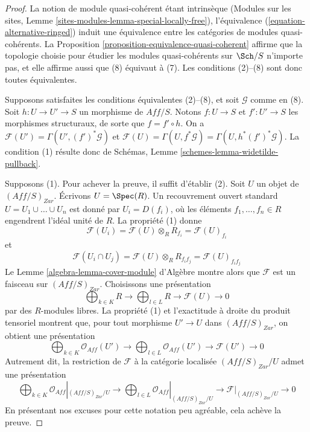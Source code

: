 \begin{proof}
La notion de module quasi-cohérent étant intrinsèque (Modules sur les sites,
Lemme \ref{sites-modules-lemma-special-locally-free}), l'équivalence
(\ref{equation-alternative-ringed}) induit une équivalence entre les
catégories de modules quasi-cohérents. La
Proposition \ref{proposition-equivalence-quasi-coherent} affirme que la
topologie choisie pour étudier les modules quasi-cohérents sur $\Sch/S$
n'importe pas, et elle affirme aussi que (8) équivaut à (7). Les conditions
(2)--(8) sont donc toutes équivalentes.

\medskip\noindent
Supposons satisfaites les conditions équivalentes (2)--(8), et soit
$\mathcal{G}$ comme en (8). Soit $h : U \to U' \to S$ un morphisme de
$\textit{Aff}/S$. Notons $f : U \to S$ et $f' : U' \to S$ les morphismes
structuraux, de sorte que $f = f' \circ h$. On a
$\mathcal{F}(U') = \Gamma(U', (f')^*\mathcal{G})$ et
$\mathcal{F}(U) = \Gamma(U, f^*\mathcal{G}) = \Gamma(U, h^*(f')^*\mathcal{G})$.
La condition (1) résulte donc de Schémas, Lemme
\ref{schemes-lemma-widetilde-pullback}.

\medskip\noindent
Supposons (1). Pour achever la preuve, il suffit d'établir (2).
Soit $U$ un objet de $(\textit{Aff}/S)_{Zar}$. Écrivons
$U = \Spec(R)$. Un recouvrement ouvert standard
$U = U_1 \cup \ldots \cup U_n$ est donné par $U_i = D(f_i)$, où les
éléments $f_1, \ldots, f_n \in R$ engendrent l'idéal unité de $R$.
La propriété (1) donne
$$
\mathcal{F}(U_i) =
\mathcal{F}(U) \otimes_R R_{f_i} =
\mathcal{F}(U)_{f_i}
$$
et
$$
\mathcal{F}(U_i \cap U_j) =
\mathcal{F}(U) \otimes_R R_{f_if_j} =
\mathcal{F}(U)_{f_if_j}
$$
Le Lemme \ref{algebra-lemma-cover-module} d'Algèbre montre alors que
$\mathcal{F}$ est un faisceau sur $(\textit{Aff}/S)_{Zar}$. Choisissons une
présentation
$$
\bigoplus\nolimits_{k \in K} R
\longrightarrow
\bigoplus\nolimits_{l \in L} R
\longrightarrow
\mathcal{F}(U)
\longrightarrow 0
$$
par des $R$-modules libres. La propriété (1) et l'exactitude à droite du
produit tensoriel montrent que, pour tout morphisme $U' \to U$ dans
$(\textit{Aff}/S)_{Zar}$, on obtient une présentation
$$
\bigoplus\nolimits_{k \in K} \mathcal{O}_{Aff}(U')
\longrightarrow
\bigoplus\nolimits_{l \in L} \mathcal{O}_{Aff}(U')
\longrightarrow
\mathcal{F}(U')
\longrightarrow 0
$$
Autrement dit, la restriction de $\mathcal{F}$ à la catégorie localisée
$(\textit{Aff}/S)_{Zar}/U$ admet une présentation
$$
\bigoplus\nolimits_{k \in K} \mathcal{O}_{Aff}|_{(\textit{Aff}/S)_{Zar}/U}
\longrightarrow
\bigoplus\nolimits_{l \in L} \mathcal{O}_{Aff}|_{(\textit{Aff}/S)_{Zar}/U}
\longrightarrow
\mathcal{F}|_{(\textit{Aff}/S)_{Zar}/U}
\longrightarrow 0
$$
En présentant nos excuses pour cette notation peu agréable, cela achève la
preuve.
\end{proof}

